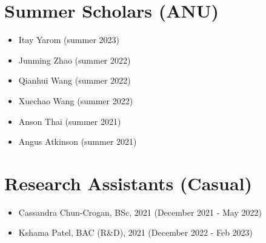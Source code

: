 \documentclass[singlecolumn,singlespace,11pt]{article}
\newcommand{\ignore}[1]{}
\begin{document}
\section*{Summer Scholars (ANU)}

\begin{itemize}

\item Itay Yarom (summer 2023)
\item Junming Zhao (summer 2022)
\item Qianhui Wang (summer 2022)
\item Xuechao Wang (summer 2022)
\item Anson Thai (summer 2021)
\item Angus Atkinson (summer 2021)

\end{itemize}

\section*{Research Assistants (Casual)}
\begin{itemize}
\item Cassandra Chun-Crogan, BSc, 2021 (December 2021 - May 2022)
\item Kshama Patel, BAC (R\&D), 2021 (December 2022 - Feb 2023)
\end{itemize}

\ignore{
\section*{Examiner (ANU)}

\begin{itemize}

\item    In 2022, the process was centralized
\item 	 COMP8800 Zixian Cai u5937495 2020 (24 units) 
\item 	 COMP3770 Calum Snowdon u6044174 2020 (6 units)
\item 	 COMP4560 Benjamin Chamberlain Gray u6677379 2021 (12 units)
\item 	 COMP4550 Jack Hendrick de Kleuver u5740954 2021 (24 units) 
\item 	 COMP4560 Yiluo Wei u6227375 2021 (12 units)
\item 	 COMP4550 Kunal Sareen u6509424 2021 (24 units)
\item 	 COMP8755 Zicheng Liu u6924878 2021 (12 units)
\item 	 COMP4550 Alexander Horvat u6048805 2021 (24 units)
\item 	 COMP4550 Matthew Law u6699654 2021 (24 units)

\end{itemize}
}
\end{document}
